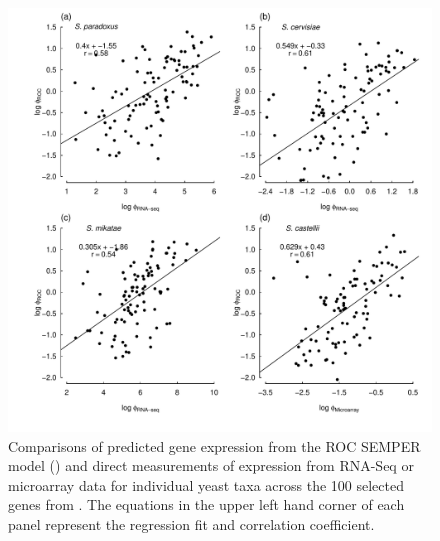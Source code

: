 \documentclass[12pt,letterpaper,fleqn]{article}
\begin{document}
\begin{figure}[H]
  \centering
  \includegraphics[width=0.9\linewidth]{FIGURE_S2_Empirical_vs_ROC_by_spp.pdf}
  \caption{Comparisons of predicted gene expression from the ROC SEMPER model (\citet{GilchristEtAl2015}) and direct measurements of expression from RNA-Seq or microarray data for individual yeast taxa across the 100 selected genes from \citet{SalichosAndRokas2013}.
        The equations in the upper left hand corner of each panel represent the regression fit and correlation coefficient.
  }
  \label{fig:ROCvsEmpirical}
\end{figure}
\end{document}
